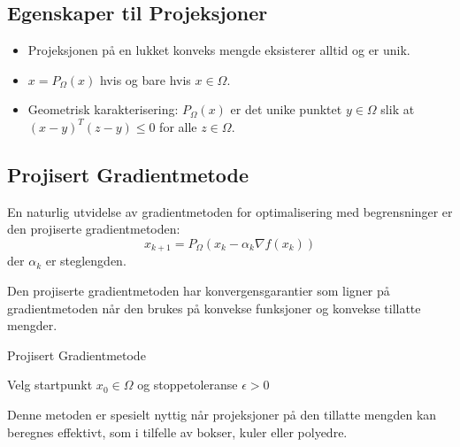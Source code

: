 \subsection{Egenskaper til Projeksjoner}
\begin{itemize}
	\item Projeksjonen på en lukket konveks mengde eksisterer alltid og er unik.
	\item \( x = P_\Omega(x) \) hvis og bare hvis \( x \in \Omega \).
	\item Geometrisk karakterisering: \( P_\Omega(x) \) er det unike punktet \( y \in \Omega \) slik at \( (x - y)^T(z - y) \leq 0 \) for alle \( z \in \Omega \).
\end{itemize}

\subsection{Projisert Gradientmetode}
En naturlig utvidelse av gradientmetoden for optimalisering med begrensninger er den projiserte gradientmetoden:
\[
	x_{k+1} = P_\Omega(x_k - \alpha_k \nabla f(x_k))
\]
der \( \alpha_k \) er steglengden.

Den projiserte gradientmetoden har konvergensgarantier som ligner på gradientmetoden når den brukes på konvekse funksjoner og konvekse tillatte mengder.

\begin{algorithm}[H]
	\caption{Projisert Gradientmetode}
	Velg startpunkt \( x_0 \in \Omega \) og stoppetoleranse \( \epsilon > 0 \)\;
\end{algorithm}

Denne metoden er spesielt nyttig når projeksjoner på den tillatte mengden kan beregnes effektivt, som i tilfelle av bokser, kuler eller polyedre.

